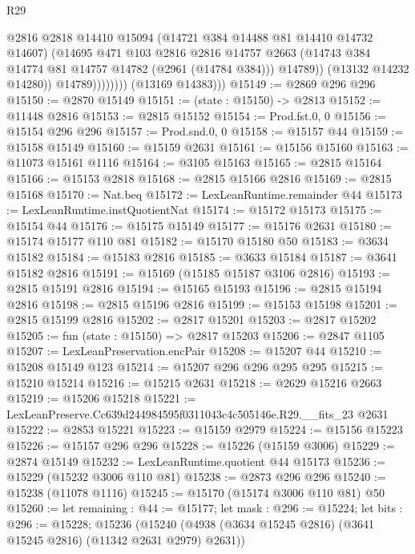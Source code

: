 \begin{lexlean}{R29}
\begin{coremodule}
                            @2816
                            @2818
                            @14410
                            @15094
                            (@14721 @384 @14488 @81 @14410 @14732 @14607)
                            (@14695
                              @471
                              @103
                              @2816
                              @2816
                              @14757
                              @2663
                              (@14743 @384 @14774 @81 @14757 @14782 (@2961 (@14784 @384)))
                              @14789))
                          (@13132 @14232 @14280))
                        @14789))))))))
        (@13169 @14383)))
@15149 := @2869 @296 @296
@15150 := @2870 @15149
@15151 := (state : @15150) -> @2813
@15152 := @11448 @2816
@15153 := @2815 @15152
@15154 := Prod.fst.{0, 0}
@15156 := @15154 @296 @296
@15157 := Prod.snd.{0, 0}
@15158 := @15157 @44
@15159 := @15158 @15149
@15160 := @15159 @2631
@15161 := @15156 @15160
@15163 := @11073 @15161 @1116
@15164 := @3105 @15163
@15165 := @2815 @15164
@15166 := @15153 @2818
@15168 := @2815 @15166 @2816
@15169 := @2815 @15168
@15170 := Nat.beq
@15172 := LexLeanRuntime.remainder @44
@15173 := LexLeanRuntime.instQuotientNat
@15174 := @15172 @15173
@15175 := @15154 @44
@15176 := @15175 @15149
@15177 := @15176 @2631
@15180 := @15174 @15177 @110 @81
@15182 := @15170 @15180 @50
@15183 := @3634 @15182
@15184 := @15183 @2816
@15185 := @3633 @15184
@15187 := @3641 @15182 @2816
@15191 := @15169 (@15185 @15187 @3106 @2816)
@15193 := @2815 @15191 @2816
@15194 := @15165 @15193
@15196 := @2815 @15194 @2816
@15198 := @2815 @15196 @2816
@15199 := @15153 @15198
@15201 := @2815 @15199 @2816
@15202 := @2817 @15201
@15203 := @2817 @15202
@15205 := fun (state : @15150) => @2817 @15203
@15206 := @2847 @1105
@15207 := LexLeanPreservation.encPair
@15208 := @15207 @44
@15210 := @15208 @15149 @123
@15214 := @15207 @296 @296 @295 @295
@15215 := @15210 @15214
@15216 := @15215 @2631
@15218 := @2629 @15216 @2663
@15219 := @15206 @15218
@15221 := LexLeanPreserve.Cc639d244984595f0311043c4c505146e.R29.__fits_23 @2631
@15222 := @2853 @15221
@15223 := @15159 @2979
@15224 := @15156 @15223
@15226 := @15157 @296 @296
@15228 := @15226 (@15159 @3006)
@15229 := @2874 @15149
@15232 := LexLeanRuntime.quotient @44 @15173
@15236 := @15229 (@15232 @3006 @110 @81)
@15238 := @2873 @296 @296
@15240 := @15238 (@11078 @1116)
@15245 := @15170 (@15174 @3006 @110 @81) @50
@15260 := let remaining : @44 := @15177;
  let mask : @296 := @15224;
  let bits : @296 := @15228;
  @15236 (@15240 (@4938 (@3634 @15245 @2816) (@3641 @15245 @2816) (@11342 @2631 @2979) @2631))

\end{coremodule}
\end{lexlean}
